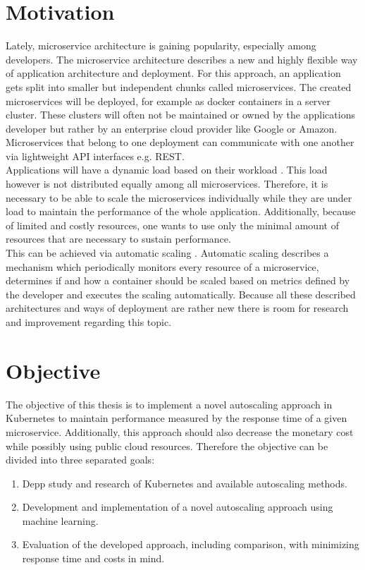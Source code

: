 \documentclass[
	english,
	ruledheaders=section,%
	class=report,%
	thesis={type=master},%
	accentcolor=8c,%
	custommargins=true,%
	marginpar=false,%
	parskip=half-,%
	fontsize=11pt,%
]{tudapub}
\begin{document}
\section{Motivation}
Lately, microservice architecture is gaining popularity, especially among developers\cite{alshuqayran2016systematic}. The microservice architecture describes a new and highly flexible way of application architecture and deployment. For this approach, an application gets split into smaller but independent chunks called microservices. The created microservices will be deployed, for example as docker containers in a server cluster. These clusters will often not be maintained or owned by the applications developer but rather by an enterprise cloud provider like Google or Amazon. Microservices that belong to one deployment can communicate with one another via lightweight API interfaces e.g. REST.\\
\newline
Applications will have a dynamic load based on their workload \cite{villamizar2015evaluating}. This load however is not distributed equally among all microservices. Therefore, it is necessary to be able to scale the microservices individually while they are under load to maintain the performance of the whole application. Additionally, because of limited and costly resources, one wants to use only the minimal amount of resources that are necessary to sustain performance.\\
\newline
This can be achieved via automatic scaling \cite{rossi2019horizontal}. Automatic scaling describes a mechanism which periodically monitors every resource of a microservice, determines if and how a container should be scaled based on metrics defined by the developer and executes the scaling automatically. Because all these described architectures and ways of deployment are rather new there is room for research and improvement regarding this topic.\\
\newpage
\section{Objective}
The objective of this thesis is to implement a novel autoscaling approach in Kubernetes to  maintain performance measured by the response time of a given microservice. Additionally, this approach should also decrease the monetary cost while possibly using public cloud resources. Therefore the objective can be divided into three separated goals:
\begin{enumerate}
	\item Depp study and research of Kubernetes and available autoscaling methods.
	\item Development and implementation of a novel autoscaling approach using machine learning.
	\item Evaluation of the developed approach, including comparison, with minimizing response time and costs in mind.
\end{enumerate}
\newpage
\end{document}
